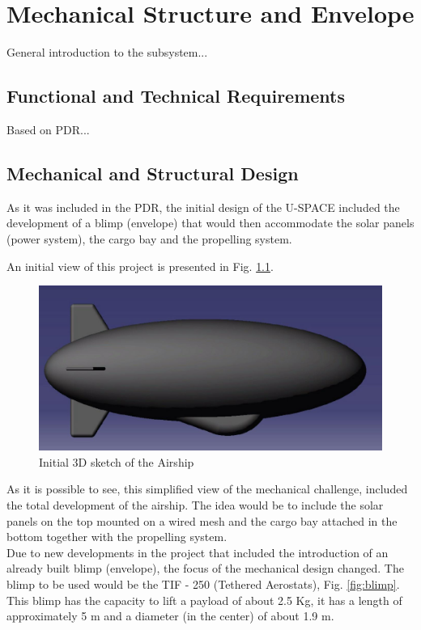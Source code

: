 \chapter{Mechanical Structure and Envelope}
\label{chap:mse}

General introduction to the subsystem...

\section{Functional and Technical Requirements}

Based on PDR...

\section{Mechanical and Structural Design}

As it was included in the PDR, the initial design of the U-SPACE included the development of a blimp (envelope) that would then accommodate the solar panels (power system), the cargo bay and the propelling system.

An initial view of this project is presented in Fig. \ref{fig:init}.  

\begin{figure}[bht]
\centering
\includegraphics[scale=0.5]{figures/init.png}
\caption{Initial 3D sketch of the Airship}
\label{fig:init}
\end{figure}

As it is possible to see, this simplified view of the mechanical challenge, included the total development of the airship. The idea would be to include the solar panels on the top mounted on a wired mesh and the cargo bay attached in the bottom together with the propelling system.\\
Due to new developments in the project that included the introduction of an already built blimp (envelope), the focus of the mechanical design changed. The blimp to be used would be the TIF - 250 (Tethered Aerostats), Fig. \ref{fig:blimp}. This blimp has the capacity to lift a payload of about 2.5 Kg, it has a length of approximately 5 m and a diameter (in the center) of about 1.9 m.

